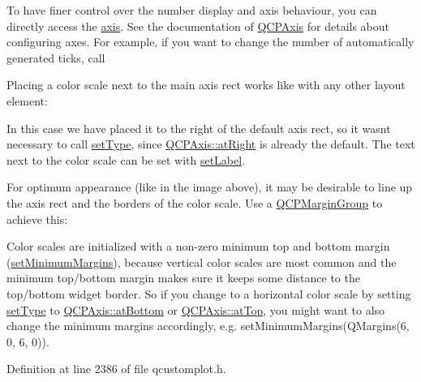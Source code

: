 To have finer control over the number display and axis behaviour, you can directly access the \hyperlink{class_q_c_p_color_scale_a1205bd67c8a33d5818aac1f6eea016a4}{axis}. See the documentation of \hyperlink{class_q_c_p_axis}{Q\+C\+P\+Axis} for details about configuring axes. For example, if you want to change the number of automatically generated ticks, call 
\begin{DoxyCodeInclude}
\end{DoxyCodeInclude}
 Placing a color scale next to the main axis rect works like with any other layout element\+: 
\begin{DoxyCodeInclude}
\end{DoxyCodeInclude}
In this case we have placed it to the right of the default axis rect, so it wasn\textquotesingle{}t necessary to call \hyperlink{class_q_c_p_color_scale_a1bf9bdb291927c422dd66b404b206f1f}{set\+Type}, since \hyperlink{class_q_c_p_axis_ae2bcc1728b382f10f064612b368bc18aadf5509f7d29199ef2f263b1dd224b345}{Q\+C\+P\+Axis\+::at\+Right} is already the default. The text next to the color scale can be set with \hyperlink{class_q_c_p_color_scale_aee124ae8396320cacf8276e9a0fbb8ce}{set\+Label}.

For optimum appearance (like in the image above), it may be desirable to line up the axis rect and the borders of the color scale. Use a \hyperlink{class_q_c_p_margin_group}{Q\+C\+P\+Margin\+Group} to achieve this\+: 
\begin{DoxyCodeInclude}
\end{DoxyCodeInclude}
 Color scales are initialized with a non-\/zero minimum top and bottom margin (\hyperlink{class_q_c_p_layout_element_a0a8a17abc16b7923159fcc7608f94673}{set\+Minimum\+Margins}), because vertical color scales are most common and the minimum top/bottom margin makes sure it keeps some distance to the top/bottom widget border. So if you change to a horizontal color scale by setting \hyperlink{class_q_c_p_color_scale_a1bf9bdb291927c422dd66b404b206f1f}{set\+Type} to \hyperlink{class_q_c_p_axis_ae2bcc1728b382f10f064612b368bc18aa220d68888516b6c3b493d144f1ba438f}{Q\+C\+P\+Axis\+::at\+Bottom} or \hyperlink{class_q_c_p_axis_ae2bcc1728b382f10f064612b368bc18aac0ece2b680d3f545e701f75af1655977}{Q\+C\+P\+Axis\+::at\+Top}, you might want to also change the minimum margins accordingly, e.\+g. {\ttfamily set\+Minimum\+Margins(\+Q\+Margins(6, 0, 6, 0))}. 

Definition at line 2386 of file qcustomplot.\+h.



